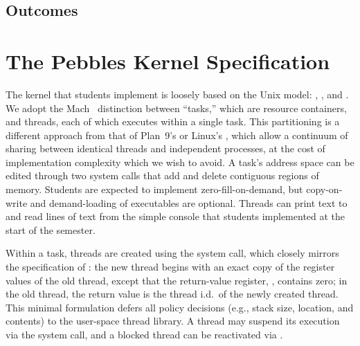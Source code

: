 \subsection{Outcomes}


\section{The Pebbles Kernel Specification}
\label{sec:pebbles}

The kernel that students implement is loosely based on the
Unix model: , , and .
We adopt the Mach~\cite{DBLP:conf/usenix/AccettaBBGRTY86}
distinction between ``tasks,''
which are resource containers,
and threads,
each of which executes within a single task.
This partitioning is a different approach from that of
Plan~9's  or Linux's ,
which allow a continuum of sharing between
identical threads and independent processes,
at the cost of implementation complexity which we wish to avoid.
A task's address space can be edited through two system
calls that add and delete contiguous regions of memory.
Students are expected to implement zero-fill-on-demand,
but copy-on-write and demand-loading of executables are
optional.
Threads can print text to and read lines of text from
the simple console that students implemented at
the start of the semester.

Within a task, threads are created using the
 system call, which closely
mirrors the specification of :
the new thread begins with an exact copy of the
register values of the old thread, except that
the return-value register, , contains
zero;
in the old thread, the return value is the thread i.d.\
of the newly created thread.
This minimal formulation defers all policy decisions
(e.g., stack size, location, and contents) to the
user-space thread library.
A thread may suspend its execution via the
 system call,
and a blocked thread can be reactivated via
.

